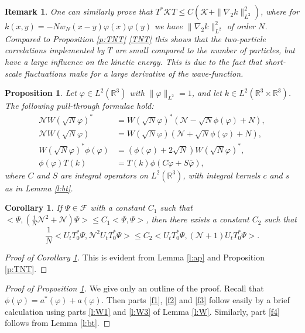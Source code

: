 \documentclass[11pt,a4paper,draft,DIV11]{scrartcl}	%
\newtheorem{cor}[thm]{Corollary}
\newtheorem{prp}[thm]{Proposition}
\newtheorem*{rem}{Remark}
\newcommand{\R}{\mathds{R}}
\newcommand{\N}{\mathcal{N}}
\newcommand{\K}{\mathcal{K}}
\newcommand{\fock}{\mathcal{F}}		%
\newcommand{\Ncal}{\mathcal{N}}		%
\newcommand{\scal}[2]{\big<#1,#2\big>} %
\newcommand{\bd}{\begin{displaymath}}			%
\newcommand{\ed}{\end{displaymath}}
\begin{document}
\begin{rem}
One can similarly prove that $T^* \K T \le C (\K + \| \nabla_2 k \|_{L^2}^2)$, where for $k(x,y) = -N w_N(x-y) \varphi(x)\varphi(y)$ we have $\| \nabla_2 k \|_{L^2}^2$ of order $N$. Compared to Proposition \ref{p:TNT} \eqref{TNT} this shows that the two-particle correlations implemented by $T$ are small compared to the number of particles, but have a large influence on the kinetic energy. This is due to the fact that short-scale fluctuations make for a large derivative of the wave-function. 
\end{rem}

\begin{prp} \label{p:f}
  Let $\varphi \in L^2(\R^3)$ with $\| \varphi \|_{L^2} = 1$, and let $k \in
  L^2(\R^3 \times \R^3)$. The following pull-through formulae hold:
  \begin{align}
    \N W(\sqrt{N} \varphi)^* & = W(\sqrt{N} \varphi)^* (\N - \sqrt{N}
    \phi(\varphi) + N), \tag{i} \label{f1} \\
    \N W(\sqrt{N} \varphi) & = W(\sqrt{N} \varphi) (\N + \sqrt{N}
    \phi(\varphi) + N), \tag{ii} \label{f2} \\
    W(\sqrt{N} \varphi)^* \phi(\varphi) & = (\phi(\varphi) + 2 \sqrt{N})
    W(\sqrt{N} \varphi)^*, \tag{iii} \label{f3} \\
    \phi(\varphi) T(k) & = T(k) \phi(C \varphi + S \overline{\varphi}),
    \tag{iv} \label{f4} 
  \end{align}
  where $C$ and $S$ are integral operators on $L^2(\R^3)$, with integral
  kernels $c$ and $s$ as in Lemma \ref{l:bt}.
\end{prp}

\begin{cor}
\label{cor:N2}
If $\Psi \in \fock$ with a constant $C_1$ such that $\scal{\Psi}{\left( \frac{1}{N}\Ncal^2+\Ncal \right)\Psi} \leq C_1 \scal{\Psi}{\Psi}$, then there exists a constant $C_2$ such that
\bd
\frac{1}{N}\scal{U_t T^\ast_0 \Psi}{\Ncal^2 U_t T^\ast_0 \Psi} \leq C_2 \scal{U_t T^\ast_0 \Psi}{\left(\Ncal+1\right)U_t T^\ast_0 \Psi}.
\ed
\end{cor}
\begin{proof}[Proof of Corollary \ref{cor:N2}]
This is evident from Lemma \ref{l:ap} and Proposition \ref{p:TNT}.
\end{proof}

\begin{proof}[Proof of Proposition \ref{p:f}]
  We give only an outline of the proof. Recall that $\phi(\varphi) =
  a^*(\varphi) + a(\varphi)$. Then parts \eqref{f1}, \eqref{f2} and \eqref{f3}
  follow easily by a brief calculation using parts \ref{l:W1} and \ref{l:W3}
  of Lemma \ref{l:W}. Similarly, part \eqref{f4} follows from Lemma
  \ref{l:bt}.
\end{proof}
\end{document}
